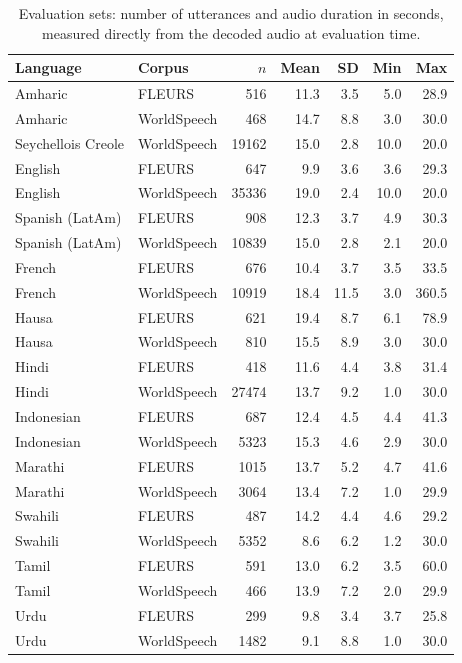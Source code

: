\begin{table}[t]
\centering
\setlength{\tabcolsep}{4pt}
\begin{tabular}{@{}llrrrrr@{}}
\toprule
\textbf{Language} & \textbf{Corpus} & \textbf{$n$} & \textbf{Mean} & \textbf{SD} & \textbf{Min} & \textbf{Max} \\
\midrule
Amharic & FLEURS & 516 & 11.3 & 3.5 & 5.0 & 28.9 \\
Amharic & WorldSpeech & 468 & 14.7 & 8.8 & 3.0 & 30.0 \\
Seychellois Creole & WorldSpeech & 19162 & 15.0 & 2.8 & 10.0 & 20.0 \\
English & FLEURS & 647 & 9.9 & 3.6 & 3.6 & 29.3 \\
English & WorldSpeech & 35336 & 19.0 & 2.4 & 10.0 & 20.0 \\
Spanish (LatAm) & FLEURS & 908 & 12.3 & 3.7 & 4.9 & 30.3 \\
Spanish (LatAm) & WorldSpeech & 10839 & 15.0 & 2.8 & 2.1 & 20.0 \\
French & FLEURS & 676 & 10.4 & 3.7 & 3.5 & 33.5 \\
French & WorldSpeech & 10919 & 18.4 & 11.5 & 3.0 & 360.5 \\
Hausa & FLEURS & 621 & 19.4 & 8.7 & 6.1 & 78.9 \\
Hausa & WorldSpeech & 810 & 15.5 & 8.9 & 3.0 & 30.0 \\
Hindi & FLEURS & 418 & 11.6 & 4.4 & 3.8 & 31.4 \\
Hindi & WorldSpeech & 27474 & 13.7 & 9.2 & 1.0 & 30.0 \\
Indonesian & FLEURS & 687 & 12.4 & 4.5 & 4.4 & 41.3 \\
Indonesian & WorldSpeech & 5323 & 15.3 & 4.6 & 2.9 & 30.0 \\
Marathi & FLEURS & 1015 & 13.7 & 5.2 & 4.7 & 41.6 \\
Marathi & WorldSpeech & 3064 & 13.4 & 7.2 & 1.0 & 29.9 \\
Swahili & FLEURS & 487 & 14.2 & 4.4 & 4.6 & 29.2 \\
Swahili & WorldSpeech & 5352 & 8.6 & 6.2 & 1.2 & 30.0 \\
Tamil & FLEURS & 591 & 13.0 & 6.2 & 3.5 & 60.0 \\
Tamil & WorldSpeech & 466 & 13.9 & 7.2 & 2.0 & 29.9 \\
Urdu & FLEURS & 299 & 9.8 & 3.4 & 3.7 & 25.8 \\
Urdu & WorldSpeech & 1482 & 9.1 & 8.8 & 1.0 & 30.0 \\
\bottomrule
\end{tabular}
\caption{Evaluation sets: number of utterances and audio duration in seconds, measured directly from the decoded audio at evaluation time.}
\label{tab:dataset-stats}
\end{table}
